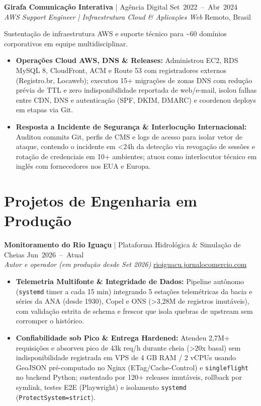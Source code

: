 \documentclass[10pt,a4paper]{article}
\begin{document}
\vspace{3pt}
\textbf{Girafa Comunicação Interativa} | Agência Digital \hfill \mbox{Set 2022 -- Abr 2024} \\
\textit{AWS Support Engineer | Infraestrutura Cloud \& Aplicações Web} \hfill Remoto, Brasil

Sustentação de infraestrutura AWS e suporte técnico para \textasciitilde{}60 domínios corporativos em equipe multidisciplinar.
\begin{itemize}[topsep=1.5pt]
    \item \textbf{Operações Cloud AWS, DNS \& Releases:} Administrou EC2, RDS MySQL 8, CloudFront, ACM e Route 53 com registradores externos (Registro.br, Locaweb); executou 15+ migrações de zonas DNS com redução prévia de TTL e zero indisponibilidade reportada de \mbox{web/e-mail}, isolou falhas entre CDN, DNS e autenticação (SPF, DKIM, DMARC) e coordenou deploys em etapas via Git.
    \item \textbf{Resposta a Incidente de Segurança \& Interlocução Internacional:} Auditou commits Git, perfis de CMS e logs de acesso para isolar vetor de ataque, contendo o incidente em <24h da detecção via revogação de sessões e rotação de credenciais em 10+ ambientes; atuou como interlocutor técnico em inglês com fornecedores nos EUA e Europa.
\end{itemize}

\section{Projetos de Engenharia em Produção}

\textbf{Monitoramento do Rio Iguaçu} | Plataforma Hidrológica \& Simulação de Cheias \hfill \mbox{Jun 2026 -- Atual} \\
\textit{Autor e operador (em produção desde Set 2026)} \hfill \href{https://rioiguacu.jornalocomercio.com}{rioiguacu.jornalocomercio.com}
\begin{itemize}[topsep=1.5pt]
    \item \textbf{Telemetria Multifonte \& Integridade de Dados:} Pipeline autônomo (\texttt{systemd} timer a cada 15 min) integrando 5 estações telemétricas da bacia e séries da ANA (desde 1930), Copel e ONS (>3,28M de registros imutáveis), com validação estrita de schema e frescor que isola quebras de upstream sem corromper o histórico.
    \item \textbf{Confiabilidade sob Pico \& Entrega Hardened:} Atendeu 2,7M+ requisições e absorveu pico de 43k req/h durante cheia (>20x basal) sem indisponibilidade registrada em VPS de 4 GB RAM / 2 vCPUs usando GeoJSON \mbox{pré-computado} no Nginx (\mbox{ETag/Cache-Control}) e \texttt{singleflight} no backend Python; sustentado por 120+ releases imutáveis, rollback por symlink, testes E2E (Playwright) e isolamento \texttt{systemd} (\mbox{\texttt{ProtectSystem=strict}}).
\end{itemize}
\end{document}
